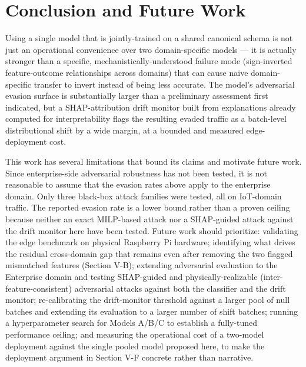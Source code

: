 \documentclass[conference]{IEEEtran}
\begin{document}
\section{Conclusion and Future Work}

Using a single model that is jointly-trained on a shared canonical schema is not just an operational convenience over two domain-specific models --- it is actually stronger than a specific, mechanistically-understood failure mode (sign-inverted feature-outcome relationships across domains) that can cause naive domain-specific transfer to invert instead of being less accurate. The model's adversarial evasion surface is substantially larger than a preliminary assessment first indicated, but a SHAP-attribution drift monitor built from explanations already computed for interpretability flags the resulting evaded traffic as a batch-level distributional shift by a wide margin, at a bounded and measured edge-deployment cost.

This work has several limitations that bound its claims and motivate future work. Since enterprise-side adversarial robustness has not been tested, it is not reasonable to assume that the evasion rates above apply to the enterprise domain. Only three black-box attack families were tested, all on IoT-domain traffic. The reported evasion rate is a lower bound rather than a proven ceiling because neither an exact MILP-based attack nor a SHAP-guided attack against the drift monitor here have been tested. Future work should prioritize: validating the edge benchmark on physical Raspberry Pi hardware; identifying what drives the residual cross-domain gap that remains even after removing the two flagged mismatched features (Section V-B); extending adversarial evaluation to the Enterprise domain and testing SHAP-guided and physically-realizable (inter-feature-consistent) adversarial attacks against both the classifier and the drift monitor; re-calibrating the drift-monitor threshold against a larger pool of null batches and extending its evaluation to a larger number of shift batches; running a hyperparameter search for Models A/B/C to establish a fully-tuned performance ceiling; and measuring the operational cost of a two-model deployment against the single pooled model proposed here, to make the deployment argument in Section V-F concrete rather than narrative.
\end{document}
